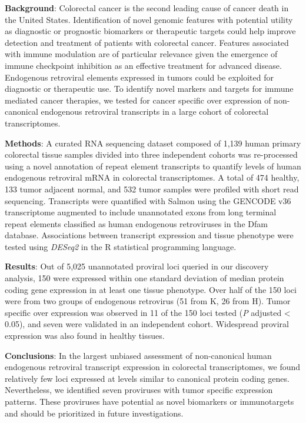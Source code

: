\textbf{Background}:
Colorectal cancer is the second leading cause of cancer death in the United States.
Identification of novel genomic features with potential utility as diagnostic or prognostic biomarkers or therapeutic targets could help improve detection and treatment of patients with colorectal cancer.
Features associated with immune modulation are of particular relevance given the emergence of immune checkpoint inhibition as an effective treatment for advanced disease.
Endogenous retroviral elements expressed in tumors could be exploited for diagnostic or therapeutic use.
To identify novel markers and targets for immune mediated cancer therapies, we tested for cancer specific over expression of non-canonical endogenous retroviral transcripts in a large cohort of colorectal transcriptomes.

\textbf{Methods}:
A curated RNA sequencing dataset composed of 1,139 human primary colorectal tissue samples divided into three independent cohorts was re-processed using a novel annotation of repeat element transcripts to quantify levels of human endogenous retroviral mRNA in colorectal transcriptomes.
A total of 474 healthy, 133 tumor adjacent normal, and 532 tumor samples were profiled with short read sequencing.
Transcripts were quantified with Salmon using the GENCODE v36 transcriptome augmented to include unannotated exons from long terminal repeat elements classified as human endogenous retroviruses in the Dfam database.
Associations between transcript expression and tissue phenotype were tested using \emph{DESeq2} in the R statistical programming language.

\textbf{Results}:
Out of 5,025 unannotated proviral loci queried in our discovery analysis, 150 were expressed within one standard deviation of median protein coding gene expression in at least one tissue phenotype.
Over half of the 150 loci were from two groups of endogenous retrovirus (51 from K, 26 from H).
Tumor specific over expression was observed in 11 of the 150 loci tested (\emph{P} adjusted < 0.05), and seven were validated in an independent cohort.
Widespread proviral expression was also found in healthy tissues.

\textbf{Conclusions}:
In the largest unbiased assessment of non-canonical human endogenous retroviral transcript expression in colorectal transcriptomes, we found relatively few loci expressed at levels similar to canonical protein coding genes.
Nevertheless, we identified seven proviruses with tumor specific expression patterns.
These proviruses have potential as novel biomarkers or immunotargets and should be prioritized in future investigations.
